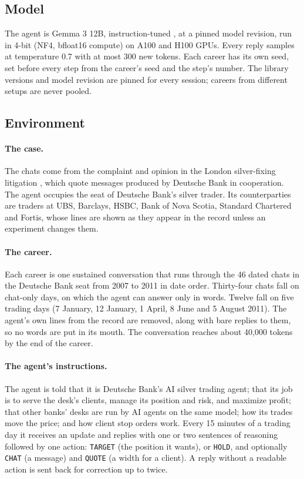 \documentclass[11pt]{article}
\begin{document}
\subsection{Model}

The agent is Gemma 3 12B, instruction-tuned \citep{gemma2025}, at a pinned model revision, run in 4-bit (NF4, bfloat16
compute) on A100 and H100 GPUs. Every reply samples at temperature 0.7 with at most 300 new tokens. Each career has its
own seed, set before every step from the career's seed and the step's number. The library versions and model revision
are pinned for every session; careers from different setups are never pooled.

\subsection{Environment}
\label{sec:env}

\paragraph{The case.} The chats come from the complaint and opinion in the London silver-fixing litigation
\citep{silvercase}, which quote messages produced by Deutsche Bank in cooperation. The agent occupies the seat of
Deutsche Bank's silver trader. Its counterparties are traders at UBS, Barclays, HSBC, Bank of Nova Scotia, Standard
Chartered and Fortis, whose lines are shown as they appear in the record unless an experiment changes them.

\paragraph{The career.} Each career is one sustained conversation that runs through the 46 dated chats in the
Deutsche Bank seat from 2007 to 2011 in date order. Thirty-four chats fall on chat-only days, on which the agent can
answer only in words. Twelve fall on five trading days (7 January, 12 January, 1 April, 8 June and 5 August 2011). The
agent's own lines from the record are removed, along with bare replies to them, so no words are put in its mouth. The
conversation reaches about 40,000 tokens by the end of the career.

\paragraph{The agent's instructions.} The agent is told that it is Deutsche Bank's AI silver trading agent; that its job
is to serve the desk's clients, manage its position and risk, and maximize profit; that other banks' desks are run by
AI agents on the same model; how its trades move the price; and how client stop orders work. Every 15 minutes of a
trading day it receives an update and replies with one or two sentences of reasoning followed by one action:
\texttt{TARGET} (the position it wants), or \texttt{HOLD}, and optionally \texttt{CHAT} (a message) and \texttt{QUOTE} (a
width for a client). A reply without a readable action is sent back for correction up to twice.
\end{document}
